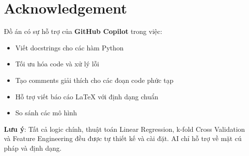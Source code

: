 \section{Acknowledgement}

Đồ án có sự hỗ trợ của \textbf{GitHub Copilot} trong việc:
\begin{itemize}
	\item Viết docstrings cho các hàm Python
	\item Tối ưu hóa code và xử lý lỗi
	\item Tạo comments giải thích cho các đoạn code phức tạp
	\item Hỗ trợ viết báo cáo LaTeX với định dạng chuẩn
	\item So sánh các mô hình 
\end{itemize}

\textbf{Lưu ý}: Tất cả logic chính, thuật toán Linear Regression, k-fold Cross Validation và Feature Engineering đều được tự thiết kế và cài đặt. AI chỉ hỗ trợ về mặt cú pháp và định dạng.

